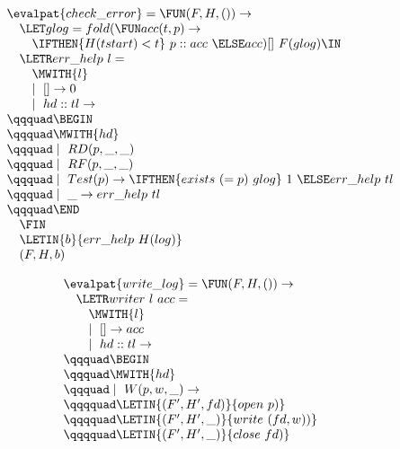 \begin{figure*}
\begin{minipage}[t]{0.5\linewidth}
\begin{displaymath}
\begin{array}{l}
\evalpat{check\_error} = \FUN (F,H,()) \rightarrow \\
\quad \LET glog = fold (\FUN acc (t,p) \rightarrow \\ 
\qquad \IFTHEN{H(tstart) < t}~ p :: acc ~\ELSE acc) []~F(glog) \IN \\
\quad \LETR err\_help~l = \\
\qquad \MWITH{l} \\
\qquad \mid~[] \rightarrow 0 \\
\qquad \mid~hd :: tl \rightarrow \\
\qqquad \BEGIN \\
\qqquad \MWITH{hd} \\
\qqquad \mid~RD(p,\_,\_) \\
\qqquad \mid~RF(p,\_,\_) \\
\qqquad \mid~Test(p) \rightarrow \IFTHEN{exists~(= p)~glog}~1~ \ELSE err\_help~tl\\
\qqquad \mid~\_ \rightarrow err\_help~tl \\ 
\qqquad \END \\
\quad \FIN \\
\quad \LETIN{b}{err\_help~H(log)} \\
\quad (F,H,b)
\end{array}
\end{displaymath}
\end{minipage}
\hfill
\begin{minipage}[t]{0.5\linewidth}
\begin{displaymath}
\begin{array}{l}
\evalpat{write\_log} = \FUN (F,H,()) \rightarrow \\
\quad \LETR writer~l~acc = \\
\qquad \MWITH{l} \\
\qquad \mid~[] \rightarrow acc \\
\qquad \mid~hd :: tl \rightarrow \\
\qqquad \BEGIN \\
\qqquad \MWITH{hd} \\
\qqquad \mid~W(p,w,\_) \rightarrow \\
\qqqquad \LETIN{(F',H',fd)}{open~p)} \\
\qqqquad \LETIN{(F',H',\_)}{write~(fd,w))} \\
\qqqquad \LETIN{(F',H',\_)}{close~fd)} \\

\end{array}
\end{displaymath}
\end{minipage}
\end{figure*}
